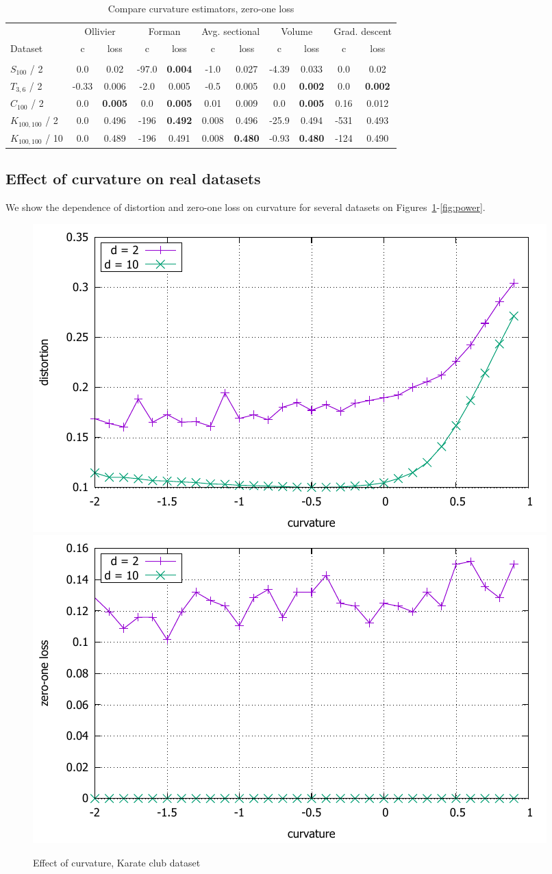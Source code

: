 \documentclass{article} %
\begin{document}
\begin{table}[t]
\caption{Compare curvature estimators, zero-one loss}
\label{tab:compare_zero_one_synth}
\begin{center}
\begin{tabular}{lcccccccc|cc}
&
\multicolumn{2}{c}{Ollivier} &
\multicolumn{2}{c}{Forman} &
\multicolumn{2}{c}{Avg. sectional} &
\multicolumn{2}{c}{Volume} &
\multicolumn{2}{|c}{Grad. descent} 
\\
Dataset & c & loss  & c & loss  & c & loss & c & loss & c & loss  
\\
\hline \\
$S_{100}$ / 2 &
0.0 & 0.02 & 
-97.0 & \textbf{0.004} & 
-1.0 & 0.027 &
-4.39 & 0.033 &
0.0 & 0.02
\\
$T_{3,6}$ / 2 &
-0.33 & 0.006 & 
-2.0 & 0.005 & 
-0.5 & 0.005 & 
0.0 & \textbf{0.002}  &
0.0 & \textbf{0.002}  
\\
$C_{100}$ / 2 & 
0.0 & \textbf{0.005} & 
0.0 & \textbf{0.005} &
0.01 & 0.009 & 
0.0 & \textbf{0.005} &
0.16 & 0.012
\\
$K_{100,100}$ / 2 &
0.0 & 0.496 & 
-196 & \textbf{0.492} & 
0.008 & 0.496 & 
-25.9 & 0.494 & 
-531 & 0.493 
\\
$K_{100,100}$ / 10 &
0.0 & 0.489 & 
-196 & 0.491 & 
0.008 & \textbf{0.480} & 
-0.93 & \textbf{0.480} &
-124 & 0.490 
\\
\end{tabular}
\end{center}
\end{table}

\subsection{Effect of curvature on real datasets}\label{sec:figures}

We show the dependence of distortion and zero-one loss on curvature for several datasets on Figures~\ref{fig:karate}-\ref{fig:power}.


\begin{figure}
    \centering
    \includegraphics[width = 0.49 \textwidth]{karate_distortion.pdf}
    \includegraphics[width = 0.49 \textwidth]{karate_zero_one.pdf}
    \caption{Effect of curvature, Karate club dataset}
    \label{fig:karate}
\end{figure}
\end{document}
